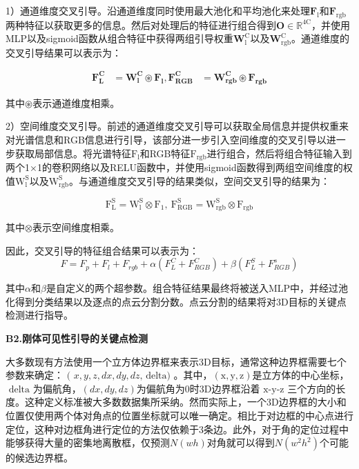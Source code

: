 \documentclass[12pt]{article}
\begin{document}
1）通道维度交叉引导。沿通道维度同时使用最大池化和平均池化来处理$\mathbf{F}_{\text {l}}$和$\mathbf{F}_{\text {rgb}}$两种特征以获取更多的信息。然后对处理后的特征进行组合得到$\mathbf{O} \in \mathbb{R}^{4 \mathrm{C}}$，并使用MLP以及sigmoid函数从组合特征中获得两组引导权重$\mathbf{W}_{\mathrm{l}}^{\mathrm{C}}$以及$\mathbf{W}_{\mathrm{rgb}}^{\mathrm{C}}$。通道维度的交叉引导结果可以表示为：

$$
\begin{aligned}
\mathbf{F}_{\mathbf{L}}^{\mathbf{C}} & =\mathbf{W}_{\mathbf{l}}^{\mathbf{C}} \circledast \mathbf{F}_{\mathbf{l}},  \mathbf{F}_{\mathbf{RGB}}^{\mathbf{C}} & =\mathbf{W}_{\mathbf{rgb}}^{\mathbf{C}} \circledast \mathbf{F}_{\mathbf{rgb}}
\end{aligned}
$$

其中$\circledast$表示通道维度相乘。

2）空间维度交叉引导。前述的通道维度交叉引导可以获取全局信息并提供权重来对光谱信息和RGB信息进行引导，该部分进一步引入空间维度的交叉引导以进一步获取局部信息。将光谱特征$\mathrm{F}_{\mathrm{l}}$和RGB特征$\mathrm{F}_{\mathrm{rgb}}$进行组合，然后将组合特征输入到两个1×1的卷积网络以及RELU函数中，并使用sigmoid函数得到两组空间维度的权值$\mathrm{W}_{\mathrm{l}}^{\mathrm{S}}$以及$\mathrm{W}_{\mathrm{rgb}}^{\mathrm{S}}$。与通道维度交叉引导的结果类似，空间交叉引导的结果为：

\begin{equation}
\mathrm{F}_{\mathrm{L}}^{\mathrm{S}}=\mathrm{W}_{\mathrm{l}}^{\mathrm{S}} \otimes \mathrm{F}_1, \mathrm{~F}_{\mathrm{RGB}}^{\mathrm{S}}=\mathrm{W}_{\mathrm{rgb}}^{\mathrm{S}} \otimes \mathrm{F}_{\mathrm{rgb}}
\end{equation}

其中$\otimes$表示空间维度相乘。

因此，交叉引导的特征组合结果可以表示为：
\begin{equation}
F=F_p+F_l+F_{rgb}+\alpha\left(F_L^C+F_{RGB}^C\right)+\beta\left(F_L^S+F_{RGB}^s\right)
\end{equation}

其中$\alpha$和$\beta$是自定义的两个超参数。组合特征结果最终将被送入MLP中，并经过池化得到分类结果以及逐点的点云分割分数。点云分割的结果将对3D目标的关键点检测进行指导。

\textbf{B2.刚体可见性引导的关键点检测}

大多数现有方法使用一个立方体边界框来表示3D目标，通常这种边界框需要七个参数来确定：$\text { ( } x, y, z, d x, d y, d z \text {, delta) }$。其中，$(\mathrm{x}, \mathrm{y}, \mathrm{z})$是立方体的中心坐标，$\text { delta }$为偏航角，$(d x, d y, d z)$为偏航角为0时3D边界框沿着$\text { x-y-z }$三个方向的长度。这种定义标准被大多数数据集所采纳。然而实际上，一个3D边界框的大小和位置仅使用两个体对角点的位置坐标就可以唯一确定。相比于对边框的中心点进行定位，这种对边框角进行定位的方法仅依赖于3条边。此外，对于角的定位过程中能够获得大量的密集地离散框，仅预测$N(w h)$对角就可以得到$N\left(w^2 h^2\right)$个可能的候选边界框。
\end{document}
